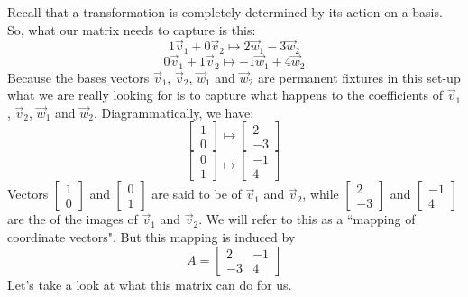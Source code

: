 \documentclass{ximera}
\begin{document}
\begin{initprob}
Recall that a transformation is completely determined by its action on a basis.  So, what our matrix needs to capture is this:
$$1\vec{v}_1+0\vec{v}_2\mapsto 2\vec{w}_1-3\vec{w}_2$$
$$0\vec{v}_1+1\vec{v}_2\mapsto -1\vec{w}_1+4\vec{w}_2$$
Because the bases vectors $\vec{v}_1$, $\vec{v}_2$, $\vec{w}_1$ and $\vec{w}_2$ are permanent fixtures in this set-up what we are really looking for is to capture what happens to the coefficients of $\vec{v}_1$, $\vec{v}_2$, $\vec{w}_1$ and $\vec{w}_2$.   Diagrammatically, we have:
$$\begin{bmatrix}1\\0\end{bmatrix}\mapsto\begin{bmatrix}2\\-3\end{bmatrix}$$
$$\begin{bmatrix}0\\1\end{bmatrix}\mapsto\begin{bmatrix}-1\\4\end{bmatrix}$$
Vectors $\begin{bmatrix}1\\0\end{bmatrix}$ and $\begin{bmatrix}0\\1\end{bmatrix}$ are said to be  of $\vec{v}_1$ and $\vec{v}_2$, while $\begin{bmatrix}2\\-3\end{bmatrix}$ and $\begin{bmatrix}-1\\4\end{bmatrix}$ are the  of the images of $\vec{v}_1$ and $\vec{v}_2$. We will refer to this as a ``mapping of coordinate vectors".  But this mapping is induced by 
$$A=\begin{bmatrix}2&-1\\-3&4\end{bmatrix}$$
Let's take a look at what this matrix can do for us.


\end{initprob}
\end{document}
